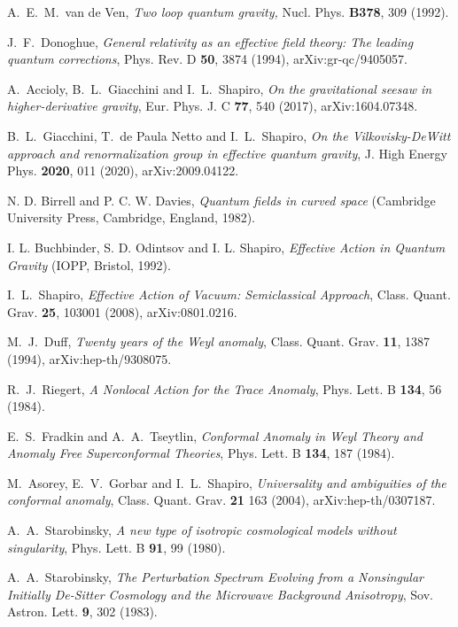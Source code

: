 \documentclass[aps,prd,a4paper,twocolumn,showpacs,showkeys,preprintnumbers,amsmath,amssymb,nofootinbib,usenames,dvipsnames]{revtex4-2}
\begin{document}
\begin{thebibliography}{99}
 A.~E.~M.~van de Ven,
{\it Two loop quantum gravity,}
Nucl. Phys. \textbf{B378}, 309 (1992). %

J.~F.~Donoghue,
{\it General relativity as an effective field theory:
The leading quantum corrections},
Phys. Rev. D {\bf 50}, 3874 (1994), %
arXiv:gr-qc/9405057.

A.~Accioly, B.~L.~Giacchini and I.~L.~Shapiro,
{\it On the gravitational seesaw in higher-derivative gravity},
Eur. Phys. J. C \textbf{77}, 540 (2017),
arXiv:1604.07348.

B.~L.~Giacchini, T.~de Paula Netto and I.~L.~Shapiro,
{\it On the Vilkovisky-DeWitt approach and renormalization group in effective quantum gravity},
J. High Energy Phys. \textbf{2020}, 011 (2020),
arXiv:2009.04122.

 N. D. Birrell and P. C. W. Davies,
{\it Quantum fields in curved space}
(Cambridge University Press, Cambridge, England, 1982).

I. L. Buchbinder, S. D. Odintsov and I. L. Shapiro, {\it
Effective Action in Quantum Gravity} (IOPP, Bristol, 1992).

I.~L.~Shapiro,
{\it Effective Action of Vacuum: Semiclassical Approach},
Class. Quant. Grav. \textbf{25}, 103001 (2008),
arXiv:0801.0216.

M.~J.~Duff,
{\it Twenty years of the Weyl anomaly},
Class. Quant. Grav. \textbf{11}, 1387 (1994),
arXiv:hep-th/9308075.

R.~J.~Riegert,
{\it A Nonlocal Action for the Trace Anomaly},
Phys. Lett. B \textbf{134}, 56 (1984).

E.~S.~Fradkin and A.~A.~Tseytlin,
{\it Conformal Anomaly in Weyl Theory and Anomaly Free Superconformal Theories},
Phys. Lett. B \textbf{134}, 187 (1984). 

M.~Asorey, E.~V.~Gorbar and I.~L.~Shapiro,
{\it Universality and ambiguities of the conformal anomaly},
Class. Quant. Grav. \textbf{21} 163 (2004), 
arXiv:hep-th/0307187.

A.~A.~Starobinsky, 
{\it A new type of isotropic cosmological models without singularity},
Phys. Lett. B {\bf 91}, 99 (1980).

A.~A.~Starobinsky,
{\it The Perturbation Spectrum Evolving from a Nonsingular Initially De-Sitter Cosmology and the Microwave Background Anisotropy},
Sov. Astron. Lett. \textbf{9}, 302 (1983).


\end{thebibliography}
\end{document}
